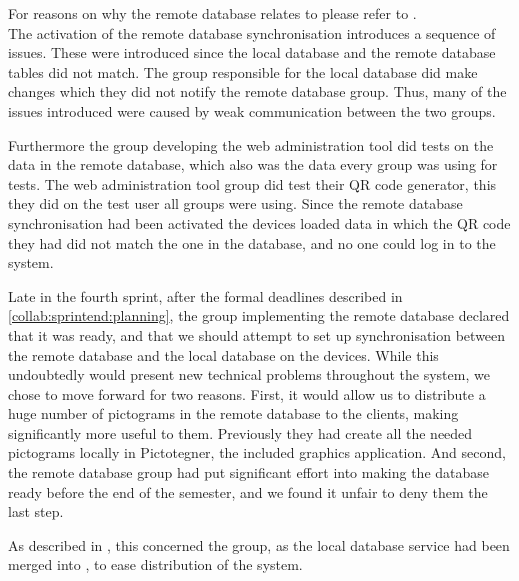 For reasons on why the remote database relates to \launcher please refer to .\\

The activation of the remote database synchronisation introduces a sequence of issues. These were introduced since the local database and the remote database tables did not match. The group responsible for the local database did make changes which they did not notify the remote database group. Thus, many of the issues introduced were caused by weak communication between the two groups.

Furthermore the group developing the web administration tool did tests on the data in the remote database, which also was the data every group was using for tests.
The web administration tool group did test their QR code generator, this they did on the test user all groups were using.
Since the remote database synchronisation had been activated the devices loaded data in which the QR code they had did not match the one in the database, and no one could log in to the system.




Late in the fourth sprint, after the formal deadlines described in \cref{collab:sprintend:planning}, the group implementing the remote database declared that it was ready, and that we should attempt to set up synchronisation between the remote database and the local database on the devices. 
While this undoubtedly would present new technical problems throughout the system, we chose to move forward for two reasons. First, it would allow us to distribute a huge number of pictograms in the remote database to the clients, making \giraf significantly more useful to them. Previously they had create all the needed pictograms locally in Pictotegner, the included graphics application. And second, the remote database group had put significant effort into making the database ready before the end of the semester, and we found it unfair to deny them the last step. 

As described in , this concerned the \launcher group, as the local database service had been merged into \launcher, to ease distribution of the system.

